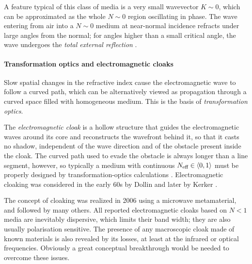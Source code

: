 A feature typical of this class of media is a very small wavevector $K\sim 0$, which can be approximated as the whole $N\sim 0$ region oscillating in phase. The wave entering from air into a $N\sim 0$ medium at near-normal incidence refracts under large angles from the normal; for angles higher than a small critical angle, the wave undergoes the \textit{total external reflection} \cite{schwartz2003total}. 


\paragraph{Transformation optics and electromagnetic cloaks} %
Slow spatial changes in the refractive index cause the electromagnetic wave to follow a curved path, which can be alternatively viewed as propagation through a curved space filled with homogeneous medium. This is the basis of \textit{transformation optics}.

The \textit{electromagnetic cloak} is a hollow structure that guides the electromagnetic waves around its core and reconstructs the wavefront behind it, so that it casts no shadow, independent of the wave direction and of the obstacle present inside the cloak. 
The curved path used to evade the obstacle is always longer than a line segment, however, so typically a medium with continuous $N_{\text{eff} }\in \langle0,1\rangle$ must be properly designed by transformation-optics calculations \cite{eleftheriades2012transforming}.
Electromagnetic cloaking %
was considered in the early 60s by Dollin \cite{dollin1961possibility} and later by Kerker \cite{kerker1975invisible}.

The concept of cloaking was realized \cite{schurig2006metamaterial} in 2006 using a microwave metamaterial, and followed by many others.
All reported electromagnetic cloaks based on $N<1$ media are inevitably dispersive, which limits their band width; they are also usually polarisation sensitive. The presence of any macroscopic cloak made of known materials is also revealed by its losses, at least at the infrared or optical frequencies. Obviously a great conceptual breakthrough would be needed to overcome these issues. 

